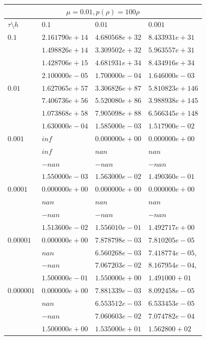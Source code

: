 \documentclass[12pt,a4paper]{article}
\begin{document}
\begin{tabular}{ |l|l|l|l| }
    \hline
    \multicolumn{4}{|c|}{$\mu = 0.01, p(\rho)  = 100\rho$}\\
    \hline
    $\tau\setminus h$ & $0.1$ & $0.01$ & $0.001$\\
    \hline
    $0.1$ & $2.161790e+14$ & $4.680568e+32$ & $8.433931e+31$ \\
    & $1.498826e+14$ & $3.309502e+32$ & $5.963557e+31$ \\
    & $1.428706e+15$ & $4.681931e+34$ & $8.434916e+34$ \\
    & $2.100000e-05$ & $1.700000e-04$ & $1.646000e-03$ \\
    \hline
    $0.01$ & $1.627065e+57$ & $3.306826e+87$ & $5.810823e+146$ \\
    & $7.406736e+56$ & $5.520080e+86$ & $3.988938e+145$ \\
    & $1.073868e+58$ & $7.905098e+88$ & $6.566345e+148$ \\
    & $1.630000e-04$ & $1.585000e-03$ & $1.517900e-02$ \\
    \hline
    $0.001$ & $inf$ & $0.000000e+00$ & $0.000000e+00$ \\
    & $inf$ & $nan$ & $nan$ \\
    & $-nan$ & $-nan$ & $-nan$ \\
    & $1.550000e-03$ & $1.563000e-02$ & $1.490360e-01$ \\
    \hline
    $0.0001$ & $0.000000e+00$ & $0.000000e+00$ & $0.000000e+00$ \\
    & $nan$ & $nan$ & $nan$ \\
    & $-nan$ & $-nan$ & $-nan$ \\
    & $1.513600e-02$ & $1.556010e-01$ & $1.492717e+00$ \\
    \hline
    $0.00001$ & $0.000000e+00$ & $7.878798e-03$ & $7.810205e-05$ \\
    & $nan$ & $6.560268e-03$ & $7.418774e-05,$ \\
    & $-nan$ & $7.067203e-02$ & $8.167954e-04,$ \\
    & $1.500000e-01$ & $1.550000e+00$ & $1.491000+01$ \\
    \hline
    $0.000001$ & $0.000000e+00$ & $7.881339e-03$ & $8.092458e-05$ \\
    & $nan$ & $6.553512e-03$ & $6.533453e-05$ \\
    & $-nan$ & $7.060603e-02$ & $7.074782e-04$ \\
    & $1.500000e+00$ & $1.535000e+01$ & $1.562800+02$ \\
    \hline
\end{tabular}
\end{document}
